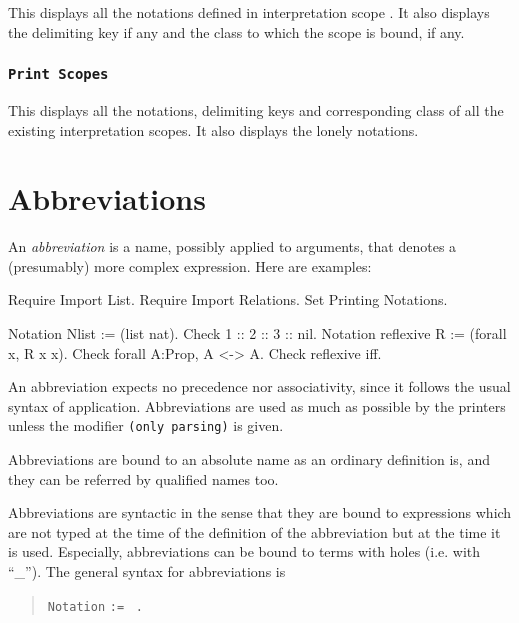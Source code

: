 This displays all the notations defined in interpretation scope
{\scope}.  It also displays the delimiting key if any and the class to
which the scope is bound, if any.

\subsubsection{\tt Print Scopes}

This displays all the notations, delimiting keys and corresponding
class of all the existing interpretation scopes.
It also displays the lonely notations.

\section[Abbreviations]{Abbreviations
\label{Abbreviations}
}

An {\em abbreviation} is a name, possibly applied to arguments, that
denotes a (presumably) more complex expression. Here are examples:

\begin{coq_eval}
Require Import List.
Require Import Relations.
Set Printing Notations.
\end{coq_eval}
\begin{coq_example}
Notation Nlist := (list nat).
Check 1 :: 2 :: 3 :: nil.
Notation reflexive R := (forall x, R x x).
Check forall A:Prop, A <-> A.
Check reflexive iff.
\end{coq_example}

An abbreviation expects no precedence nor associativity, since it
follows the usual syntax of application. Abbreviations are used as
much as possible by the {\Coq} printers unless the modifier
\verb=(only parsing)= is given.

Abbreviations are bound to an absolute name as an ordinary
definition is, and they can be referred by qualified names too.

Abbreviations are syntactic in the sense that they are bound to
expressions which are not typed at the time of the definition of the
abbreviation but at the time it is used. Especially, abbreviations can
be bound to terms with holes (i.e. with ``\_''). The general syntax
for abbreviations is
\begin{quote}
 \texttt{Notation} {\ident} \sequence{\ident} {\ident} \texttt{:=} {\term} 
 ~\verb=.=
\end{quote}

